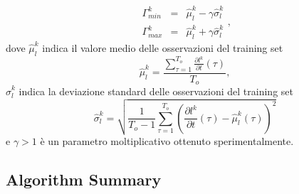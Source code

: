 \documentclass{llncs}
\begin{document}
\begin{equation}
\label{eq:soglieLuma}
\begin{array}{rcl}
\Gamma_{min}^k & = & \hat{\mu}_l^k -\gamma \hat{\sigma}_l^k\\
\Gamma_{max}^k & = & \hat{\mu}_l^k + \gamma \hat{\sigma}_l^k
\end{array},
\end{equation}
dove $\hat{\mu}_l^k$ indica il valore medio delle osservazioni del training set
\begin{equation}
\hat{\mu}_l^k = \frac{\sum_{\tau = 1}^{T_{o}} \frac{\partial l^k}{\partial t}(\tau)}{T_{o}}, \nonumber
\end{equation}
$\hat{\sigma}_l^k$ indica la deviazione standard delle osservazioni del training set
\begin{equation}
\hat{\sigma}_l^k  = \sqrt{\frac{1}{T_{o}-1}\sum_{\tau=1}^{T_{o}}\left(\frac{\partial l^k}{\partial t}(\tau) - \hat{\mu}_l^k(\tau)\right)^2} \nonumber
\end{equation}
e $\gamma>1$ \`e un parametro moltiplicativo ottenuto sperimentalmente.\\




\subsection{Algorithm Summary}\label{subsec:AlgorithmSummary}
\end{document}
